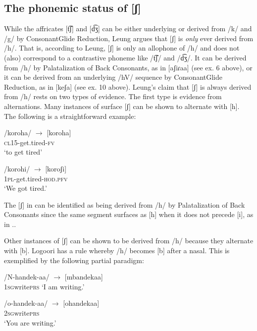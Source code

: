 \documentclass[output=paper]{langsci/langscibook}
\begin{document}
\subsection{The phonemic status of [ʃ]} %

While the affricates [t͡ʃ] and [d͡ʒ] can be either underlying or derived from /k/ and /g/ by ConsonantGlide Reduction, Leung argues that [ʃ] is \textit{only} ever derived from /h/. That is, according to Leung, [ʃ] is only an allophone of /h/ and does not (also) correspond to a contrastive phoneme like /t͡ʃ/ and /d͡ʒ/. It can be derived from /h/ by Palatalization of Back Consonants, as in [aʃiɾaa] (see ex. 6 above), or it can be derived from an underlying /hV/ sequence by ConsonantGlide Reduction, as in [keʃa] (see ex. 10 above). Leung’s claim that [ʃ] is always derived from /h/ rests on two types of evidence. The first type is evidence from alternations. Many instances of surface [ʃ] can be shown to alternate with [h]. The following is a straightforward example:


\ea\label{ex:glewwe:13}{}
   \ea\label{ex:glewwe:13a}
 /koroha/  $\rightarrow$  [koroha]\\{}
\textsc{cl15}-get.tired-\textsc{fv}\\{}
\glt ‘to get tired’ \citep[38]{Leung1991}

\ex\label{ex:glewwe:13b}{}
 /korohi/  $\rightarrow$  [koroʃi]\\{}
\textsc{1pl}-get.tired-\textsc{hod.pfv}\\{}
\glt ‘We got tired.’ \citep[38]{Leung1991}
\z
\z 

The [ʃ] in  can be identified as being derived from /h/ by Palatalization of Back Consonants since the same segment surfaces as [h] when it does not precede [i], as in .. 

Other instances of [ʃ] can be shown to be derived from /h/ because they alternate with [b]. Logoori has a rule whereby /h/ becomes [b] after a nasal. This is exemplified by the following partial paradigm:

\ea\label{ex:glewwe:14}{}
   \ea\label{ex:glewwe:14a}
/N-handek-aa/  $\rightarrow$  [mbandekaa] \\{}
\textsc{1sg}write\textsc{prs}
\glt ‘I am writing.’

\ex\label{ex:glewwe:14b}{}
/o-handek-aa/  $\rightarrow$  [ohandekaa]\\{}
\textsc{2sg}write\textsc{prs}\\{}
\glt ‘You are writing.’
\end{document}
